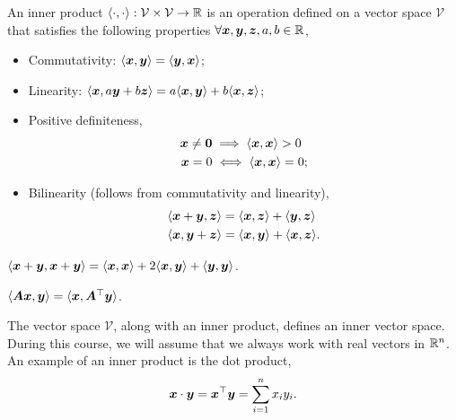 \begin{definition}
    An inner product $\langle \cdot,\cdot \rangle: \mathcal{V} \times \mathcal{V} \to \mathbb{R}$ is an operation
    defined on a vector space $\mathcal{V}$ that satisfies the following properties $\forall \bm{x},\bm{y},\bm{z},a,b\in \mathbb{R}$,
    \begin{itemize}
        \item Commutativity: $\langle \bm{x},\bm{y} \rangle = \langle \bm{y},\bm{x} \rangle$;
        \item Linearity: $\langle \bm{x},a \bm{y} + b \bm{z} \rangle = a \langle \bm{x},\bm{y} \rangle +
                  b\langle \bm{x},\bm{z} \rangle$;
        \item Positive definiteness,
              \begin{align*}
                  \bm{x} \neq \bm{0} & \implies \langle \bm{x},\bm{x} \rangle > 0 \\
                  \bm{x} = 0          & \iff \langle \bm{x},\bm{x} \rangle = 0;
              \end{align*}
        \item Bilinearity (follows from commutativity and linearity),
              \begin{align*}
                  \langle \bm{x} + \bm{y}, \bm{z} \rangle & = \langle \bm{x},\bm{z} \rangle + \langle \bm{y},\bm{z} \rangle  \\
                  \langle \bm{x},\bm{y} + \bm{z} \rangle  & = \langle \bm{x},\bm{y} \rangle + \langle \bm{x},\bm{z} \rangle.
              \end{align*}
    \end{itemize}
\end{definition}

\begin{corollary}
    $\langle \bm{x}+\bm{y},\bm{x}+\bm{y} \rangle = \langle \bm{x},\bm{x} \rangle + 2\langle \bm{x},\bm{y} \rangle + \langle \bm{y},\bm{y} \rangle$.
\end{corollary}

\begin{corollary}
    $\langle \bm{A}\bm{x}, \bm{y} \rangle = \langle \bm{x}, \bm{A}^\top \bm{y} \rangle$.
\end{corollary}

The vector space $\mathcal{V}$, along with an inner product, defines an inner vector space. During
this course, we will assume that we always work with real vectors in $\mathbb{R}^n$. An example of an inner
product is the dot product, \[
    \bm{x}\cdot \bm{y} = \bm{x}^\top \bm{y} = \sum_{i=1}^{n} x_i y_i.
\]

